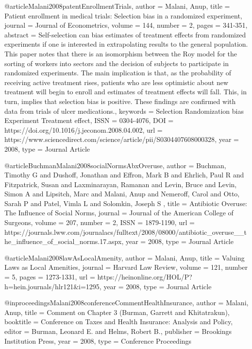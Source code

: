 @article{Malani2008patentEnrollmentTrials,
   author = {Malani, Anup},
   title = {Patient enrollment in medical trials: Selection bias in a randomized experiment},
   journal = {Journal of Econometrics},
   volume = {144},
   number = {2},
   pages = {341-351},
   abstract = {Self-selection can bias estimates of treatment effects from randomized experiments if one is interested in extrapolating results to the general population. This paper notes that there is an isomorphism between the Roy model for the sorting of workers into sectors and the decision of subjects to participate in randomized experiments. The main implication is that, as the probability of receiving active treatment rises, patients who are less optimistic about new treatment will begin to enroll and estimates of treatment effects will fall. This, in turn, implies that selection bias is positive. These findings are confirmed with data from trials of ulcer medications.},
   keywords = {Selection
Randomization bias
Experiment
Treatment effect},
   ISSN = {0304-4076},
   DOI = {https://doi.org/10.1016/j.jeconom.2008.04.002},
   url = {https://www.sciencedirect.com/science/article/pii/S0304407608000328},
   year = {2008},
   type = {Journal Article}
}

@article{BuchmanMalani2008socialNormsAbxOveruse,
   author = {Buchman, Timothy G  and Dushoff, Jonathan  and Effron, Mark B  and Ehrlich, Paul R  and Fitzpatrick, Susan  and Laxminarayan, Ramanan  and Levin, Bruce  and Levin, Simon A  and Lipsitch, Marc  and Malani, Anup  and Nemeroff, Carol  and Otto, Sarah P  and Patel, Vimla L  and Solomkin, Joseph S },
   title = {Antibiotic Overuse: The Influence of Social Norms},
   journal = {Journal of the American College of Surgeons},
   volume = {207},
   number = {2},
   ISSN = {1879-1190},
   url = {https://journals.lww.com/journalacs/fulltext/2008/08000/antibiotic_overuse__the_influence_of_social_norms.17.aspx},
   year = {2008},
   type = {Journal Article}
}

@article{Malani2008lawAsLocalAmenity,
   author = {Malani, Anup},
   title = {Valuing Laws as Local Amenities},
   journal = {Harvard Law Review},
   volume = {121},
   number = {5},
   pages = {1273-1331},
   url = {https://heinonline.org/HOL/P?h=hein.journals/hlr121&i=1295},
   year = {2008},
   type = {Journal Article}
}


@inproceedings{Malani2008conferenceCommentHealthInsurance,
   author = {Malani, Anup},
   title = {Comment on Chapter 3 (Burman, Garrett and Khitatrakun)},
   booktitle = {Conference on Taxes and Health Insurance: Analysis and Policy},
   editor = {Burman, Leonard E. and Helms, Robert B.},
   publisher = {Brookings Institution Press},
   year = {2008},
   type = {Conference Proceedings}
}

